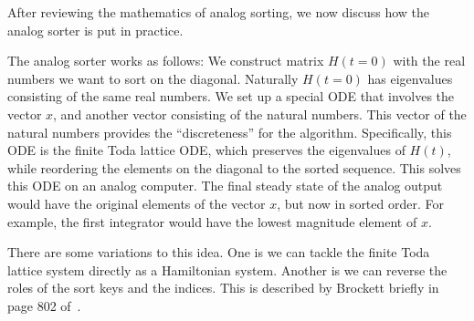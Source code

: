 After reviewing the mathematics of analog sorting, we now discuss how the analog sorter is put in practice.

The analog sorter works as follows:
We construct matrix $H(t=0)$ with the real numbers we want to sort on the diagonal.
Naturally $H(t=0)$ has eigenvalues consisting of the same real numbers.
We set up a special ODE that involves the vector $x$, and another vector consisting of the natural numbers.
This vector of the natural numbers provides the ``discreteness'' for the algorithm.
Specifically, this ODE is the finite Toda lattice ODE, which preserves the eigenvalues of $H(t)$, while reordering the elements on the diagonal to the sorted sequence.
This solves this ODE on an analog computer.
The final steady state of the analog output would have the original elements of the vector $x$, but now in sorted order.
For example, the first integrator would have the lowest magnitude element of $x$.



There are some variations to this idea.
One is we can tackle the finite Toda lattice system directly as a Hamiltonian system.
Another is we can reverse the roles of the sort keys and the indices.
This is described by Brockett briefly in page 802 of~\cite{brockett}.
